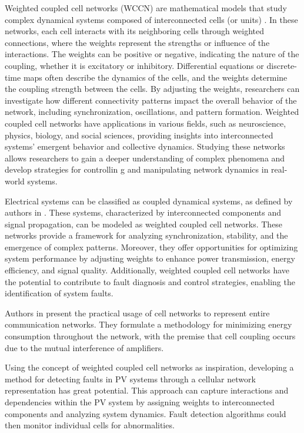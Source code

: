 Weighted coupled cell networks (WCCN) are mathematical models that study complex dynamical systems composed of interconnected cells (or units) \cite{Aguiar2010} \cite{Aguiar2020}. In these networks, each cell interacts with its neighboring cells through weighted connections, where the weights represent the strengths or influence of the interactions. The weights can be positive or negative, indicating the nature of the coupling, whether it is excitatory or inhibitory. Differential equations or discrete-time maps often describe the dynamics of the cells, and the weights determine the coupling strength between the cells. By adjusting the weights, researchers can investigate how different connectivity patterns impact the overall behavior of the network, including synchronization, oscillations, and pattern formation. Weighted coupled cell networks have applications in various fields, such as neuroscience, physics, biology, and social sciences, providing insights into interconnected systems' emergent behavior and collective dynamics. Studying these networks allows researchers to gain a deeper understanding of complex phenomena and develop strategies for controllin g and manipulating network dynamics in real-world systems.

Electrical systems can be classified as coupled dynamical systems, as defined by authors in \cite{Aguiar2010}. These systems, characterized by interconnected components and signal propagation, can be modeled as weighted coupled cell networks. These networks provide a framework for analyzing synchronization, stability, and the emergence of complex patterns. Moreover, they offer opportunities for optimizing system performance by adjusting weights to enhance power transmission, energy efficiency, and signal quality. Additionally, weighted coupled cell networks have the potential to contribute to fault diagnosis and control strategies, enabling the identification of system faults.

Authors in \cite{Ho2015} present the practical usage of cell networks to represent entire communication networks. They formulate a methodology for minimizing energy consumption throughout the network, with the premise that cell coupling occurs due to the mutual interference of amplifiers.

Using the concept of weighted coupled cell networks as inspiration, developing a method for detecting faults in PV systems through a cellular network representation has great potential. This approach can capture interactions and dependencies within the PV system by assigning weights to interconnected components and analyzing system dynamics. Fault detection algorithms could then monitor individual cells for abnormalities.

